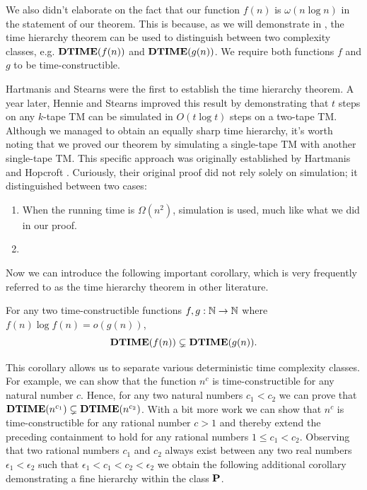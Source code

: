 \documentclass[11pt,twoside=off,numbers=noenddot]{scrbook}
\begin{document}
\begin{remark}
  We also didn't elaborate on the fact that our function $f(n)$ is $\omega(n \log n)$ in the statement of our theorem. This is because, as we will demonstrate in , the time hierarchy theorem can be used to distinguish between two complexity classes, e.g. $\textbf{DTIME}(f(n))$ and $\textbf{DTIME}(g(n))$. We require both functions $f$ and $g$ to be time-constructible.
\end{remark}

\begin{remark}
  Hartmanis and Stearns \cite{hartmanis1965computational} were the first to establish the time hierarchy theorem. A year later, Hennie and Stearns \cite{hennie1966two} improved this result by demonstrating that $t$ steps on any $k$-tape TM can be simulated in $O(t \log t)$ steps on a two-tape TM. Although we managed to obtain an equally sharp time hierarchy, it's worth noting that we proved our theorem by simulating a single-tape TM with another single-tape TM. This specific approach was originally established by Hartmanis and Hopcroft \cite{hartmanis1968computational}. Curiously, their original proof did not rely solely on simulation; it distinguished between two cases:
  \begin{enumerate}
    \item When the running time is $\Omega(n^2)$, simulation is used, much like what we did in our proof.
    \item {}
  \end{enumerate}
\end{remark}

Now we can introduce the following important corollary, which is very frequently referred to as the time hierarchy theorem in other literature.

\begin{corollary}
  For any two time-constructible functions $f, g : \mathbb N \to \mathbb N$ where $f(n) \log f(n) = o(g(n))$,
  \[ \textbf{DTIME}(f(n)) \subsetneq \textbf{DTIME}(g(n)). \]
\end{corollary}

This corollary allows us to separate various deterministic time complexity classes. For example, we can show that the function $n^c$ is time-constructible for any natural number $c$. Hence, for any two natural numbers $c_1 < c_2$ we can prove that $\textbf{DTIME}(n^{c_1}) \subsetneq \textbf{DTIME}(n^{c_2})$. With a bit more work we can show that $n^c$ is time-constructible for any rational number $c > 1$ and thereby extend the preceding containment to hold for any rational numbers $1 \leq c_1 < c_2$. Observing that two rational numbers $c_1$ and $c_2$ always exist between any two real numbers $\epsilon_1 < \epsilon_2$ such that $\epsilon_1 < c_1 < c_2 < \epsilon_2$ we obtain the following additional corollary demonstrating a fine hierarchy within the class $\textbf{P}$.
\end{document}
